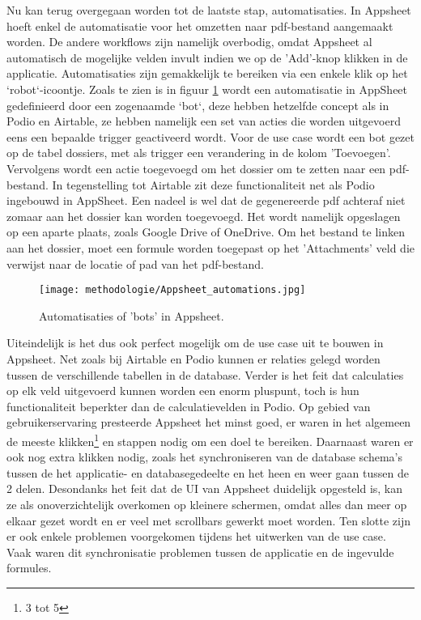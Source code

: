 Nu kan terug overgegaan worden tot de laatste stap, automatisaties. In Appsheet hoeft enkel de automatisatie voor het omzetten naar pdf-bestand aangemaakt worden. De andere workflows zijn namelijk overbodig, omdat Appsheet al automatisch de mogelijke velden invult indien we op de 'Add'-knop klikken in de applicatie. Automatisaties zijn gemakkelijk te bereiken via een enkele klik op het `robot`-icoontje. Zoals te zien is in figuur \ref{fig:meth_appsheet_automations} wordt een automatisatie in AppSheet gedefinieerd door een zogenaamde `bot`, deze hebben hetzelfde concept als in Podio en Airtable, ze hebben namelijk een set van acties die worden uitgevoerd eens een bepaalde trigger geactiveerd wordt. Voor de use case wordt een bot gezet op de tabel dossiers, met als trigger een verandering in de kolom 'Toevoegen'.
Vervolgens wordt een actie toegevoegd om het dossier om te zetten naar een pdf-bestand. In tegenstelling tot Airtable zit deze functionaliteit net als Podio ingebouwd in AppSheet. Een nadeel is wel dat de gegenereerde pdf achteraf niet zomaar aan het dossier kan worden toegevoegd. Het wordt namelijk opgeslagen op een aparte plaats, zoals Google Drive of OneDrive. Om het bestand te linken aan het dossier, moet een formule worden toegepast op het 'Attachments' veld die verwijst naar de locatie of pad van het pdf-bestand. \\


\begin{figure}[ht]
    \centering
    \texttt{[image: methodologie/Appsheet\_automations.jpg]}
    \caption{Automatisaties of 'bots' in Appsheet.}
    \label{fig:meth_appsheet_automations}
\end{figure}


Uiteindelijk is het dus ook perfect mogelijk om de use case uit te bouwen in Appsheet. Net zoals bij Airtable en Podio kunnen er relaties gelegd worden tussen de verschillende tabellen in de database. Verder is het feit dat calculaties op elk veld uitgevoerd kunnen worden een enorm pluspunt, toch is hun functionaliteit beperkter dan de calculatievelden in Podio. Op gebied van gebruikerservaring presteerde Appsheet het minst goed, er waren in het algemeen de meeste klikken\footnote{3 tot 5} en stappen nodig om een doel te bereiken. Daarnaast waren er ook nog extra klikken nodig, zoals het synchroniseren van de database schema's tussen de het applicatie- en databasegedeelte en het heen en weer gaan tussen de 2 delen. Desondanks het feit dat de UI van Appsheet duidelijk opgesteld is, kan ze als onoverzichtelijk overkomen op kleinere schermen, omdat alles dan meer op elkaar gezet wordt en er veel met scrollbars gewerkt moet worden. Ten slotte zijn er ook enkele problemen voorgekomen tijdens het uitwerken van de use case. Vaak waren dit synchronisatie problemen tussen de applicatie en de ingevulde formules. \\
